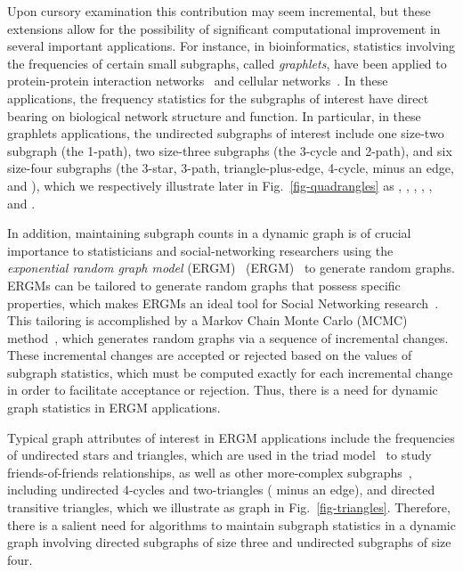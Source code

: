 \documentclass[11pt]{article}
\begin{document}
Upon cursory examination this contribution may seem incremental, but these 
extensions allow for the possibility of significant computational improvement in several important applications.
For instance, in bioinformatics, statistics involving the frequencies of 
certain small subgraphs, called \emph{graphlets}, have been applied
to protein-protein interaction networks~\cite{tp-ubnfv-08,pcj-eegfd-06} 
and cellular networks~\cite{p-bncug-07}.
In these applications, the frequency statistics for the
subgraphs of interest
have direct bearing on biological network structure and function.
In particular, in these graphlets applications,
the undirected subgraphs of interest include 
one size-two subgraph (the 1-path), two size-three subgraphs
(the 3-cycle and 2-path), and six size-four subgraphs
(the 3-star, 3-path, triangle-plus-edge, 4-cycle,  minus an
edge, and ), which we respectively illustrate later in 
Fig.~\ref{fig-quadrangles}
as 
, 
, 
, 
, 
, 
and .

In addition,
maintaining subgraph counts in a dynamic graph is of crucial
importance to statisticians and social-networking researchers using the 
\emph{exponential random graph model} 
\ifFull
(ERGM)~\cite{Fra-SN-91,RobMor-SN-07,Sni-JoSS-02,WasPat-Psy-96}
\else
(ERGM)~\cite{Fra-SN-91,Sni-JoSS-02,WasPat-Psy-96}
\fi
to generate random graphs.
ERGMs can be tailored to
generate random graphs that possess
specific properties, which makes ERGMs an ideal tool for Social
Networking research~\cite{WasPat-Psy-96,Sni-JoSS-02}.
This tailoring is accomplished by
a Markov Chain Monte Carlo (MCMC) method~\cite{Sni-JoSS-02},
which generates random 
graphs via a sequence of incremental changes.
These incremental changes are accepted or rejected based on
the values of subgraph statistics, which must
be computed exactly for each incremental change in order to
facilitate acceptance or rejection.
Thus, there is a need for dynamic graph statistics in ERGM
applications.

Typical graph attributes of interest in ERGM applications include
the frequencies of undirected stars and triangles, 
which are used in the triad model~\cite{FraStr-JASA-86}
to study friends-of-friends relationships, as well as
other more-complex subgraphs~\cite{SniPatRob-SM-06},
including undirected 4-cycles and two-triangles ( minus an edge), 
and directed transitive triangles, which we illustrate as graph 
in Fig.~\ref{fig-triangles}.
Therefore, there is
a salient need for algorithms to maintain subgraph statistics
in a dynamic graph involving directed subgraphs of size three and
undirected subgraphs of size four.
\end{document}
